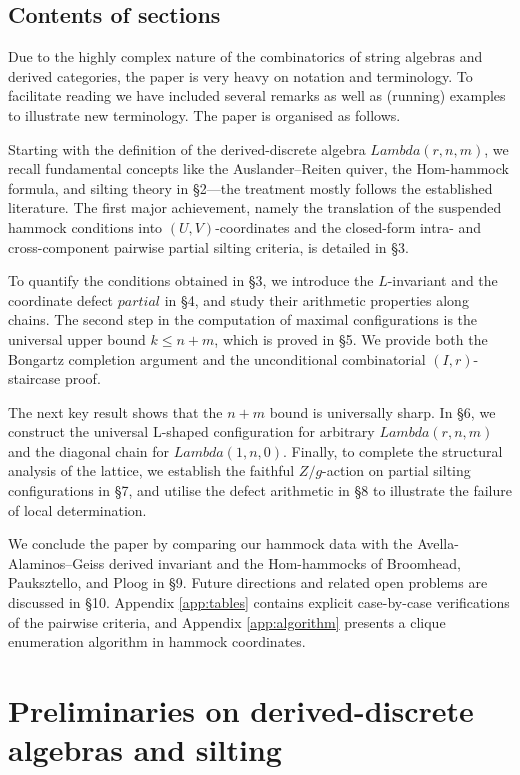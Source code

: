 \documentclass[11pt, a4paper]{article}
\theoremstyle{definition}
\def\Lambda{Lambda}%
\def\partial{partial}%
\def\ss{ss}%
\def\mathbb#1{#1}%
\begin{document}
\subsection{Contents of sections}
\label{subsec:intro-contents}

Due to the highly complex nature of the combinatorics of string algebras and derived categories, the paper is very heavy on notation and terminology. To facilitate reading we have included several remarks as well as (running) examples to illustrate new terminology. The paper is organised as follows.

Starting with the definition of the derived-discrete algebra $\Lambda(r,n,m)$, we recall fundamental concepts like the Auslander--Reiten quiver, the Hom-hammock formula, and silting theory in \S 2---the treatment mostly follows the established literature. The first major achievement, namely the translation of the suspended hammock conditions into $(U,V)$-coordinates and the closed-form intra- and cross-component pairwise partial silting criteria, is detailed in \S 3.

To quantify the conditions obtained in \S 3, we introduce the $L$-invariant and the coordinate defect $\partial$ in \S 4, and study their arithmetic properties along chains. The second step in the computation of maximal configurations is the universal upper bound $k \le n+m$, which is proved in \S 5. We provide both the Bongartz completion argument and the unconditional combinatorial $(I,r)$-staircase proof.

The next key result shows that the $n+m$ bound is universally sharp. In \S 6, we construct the universal L-shaped configuration for arbitrary $\Lambda(r,n,m)$ and the diagonal chain for $\Lambda(1,n,0)$. Finally, to complete the structural analysis of the lattice, we establish the faithful $\mathbb{Z}/g$-action on partial silting configurations in \S 7, and utilise the defect arithmetic in \S 8 to illustrate the failure of local determination.

We conclude the paper by comparing our hammock data with the Avella-Alaminos--Gei\ss{} derived invariant and the Hom-hammocks of Broomhead, Pauksztello, and Ploog in \S 9. Future directions and related open problems are discussed in \S 10. Appendix \ref{app:tables} contains explicit case-by-case verifications of the pairwise criteria, and Appendix \ref{app:algorithm} presents a clique enumeration algorithm in hammock coordinates.

\section{Preliminaries on derived-discrete algebras and silting}
\label{sec:preliminaries}
\end{document}

